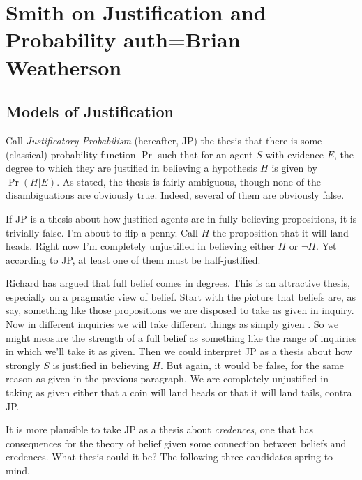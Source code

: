 \chapter[Justification and Probability]{Smith on Justification and Probability auth=Brian Weatherson}


\section{Models of Justification}
\label{modelsofjustification}

Call \emph{Justificatory Probabilism} (hereafter, JP) the thesis that there is some (classical) probability function $\Pr$ such that for an agent $S$ with evidence $E$, the degree to which they are justified in believing a hypothesis $H$ is given by $\Pr(H | E)$. As stated, the thesis is fairly ambiguous, though none of the disambiguations are obviously true. Indeed, several of them are obviously false.

If JP is a thesis about how justified agents are in fully believing propositions, it is trivially false. I'm about to flip a penny. Call $H$ the proposition that it will land heads. Right now I'm completely unjustified in believing either $H$ or $\neg H$. Yet according to JP, at least one of them must be half-justified.

Richard \citet{Holton2008} has argued that full belief comes in degrees. This is an attractive thesis, especially on a pragmatic view of belief. Start with the picture that beliefs are, as \citet{SchroederRoss2012} say, something like those propositions we are disposed to take as given in inquiry. Now in different inquiries we will take different things as simply given \citep{Hawthorne2004}. So we might measure the strength of a full belief as something like the range of inquiries in which we'll take it as given. Then we could interpret JP as a thesis about how strongly $S$ is justified in believing $H$. But again, it would be false, for the same reason as given in the previous paragraph. We are completely unjustified in taking as given either that a coin will land heads or that it will land tails, contra JP.

It is more plausible to take JP as a thesis about \emph{credences}, one that has consequences for the theory of belief given some connection between beliefs and credences. What thesis could it be? The following three candidates spring to mind.

